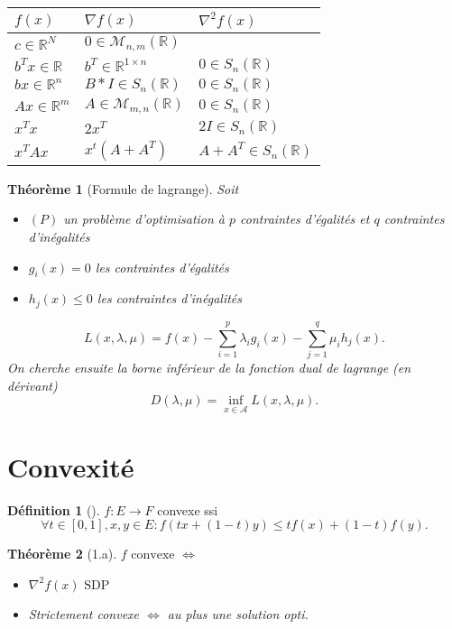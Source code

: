 \documentclass{article}
\theoremstyle{plain}%
\newtheorem{thm}{Théorème}[section]
\theoremstyle{definition}
\newtheorem{defn}{Définition}[section]
\begin{document}
\begin{table}[!h]
    \centering
    \begin{tabular}{|l|l|l|}
    \hline
        $ f(x) $                    & $ \nabla f(x) $                           & $ \nabla ^2 f(x) $            \\ \hline
        $ c \in \mathbb{R}^N $      & $ 0 \in \mathcal{M}_{n,m}(\mathbb{R}) $   & $ ~ $                         \\ \hline
        $ b^T x \in \mathbb{R} $    & $ b^T \in \mathbb{R}^{1 \times n} $       & $ 0 \in S_n(\mathbb{R}) $     \\ \hline
        $ bx \in \mathbb{R}^n $     & $ B*I \in S_n(\mathbb{R}) $               & $ 0 \in S_n(\mathbb{R}) $     \\ \hline
        $ Ax \in \mathbb{R}^m $     & $ A \in \mathcal{M}_{m,n}(\mathbb{R}) $   & $ 0 \in S_n(\mathbb{R}) $     \\ \hline
        $ x^Tx $                    & $ 2x^T $                                  & $ 2 I \in S_n(\mathbb{R}) $   \\ \hline
        $ x^T A x $                 & $ x^t (A + A^T) $                         & $ A+A^T \in S_n(\mathbb{R}) $ \\ \hline
    \end{tabular}
\end{table}

\begin{thm}[Formule de lagrange]
    Soit 
    \begin{itemize}
        \item $ (P) $ un problème d'optimisation à $ p $ contraintes d'égalités et $ q $ contraintes d'inégalités
        \item $ g_i (x) = 0 $ les contraintes d'égalités 
        \item $ h_j(x) \leq 0 $ les contraintes d'inégalités
    \end{itemize}
    \[
        L(x, \lambda , \mu ) = f(x) - \sum_{i=1}^{p}\lambda _i g_i(x) - \sum_{j=1}^{q}\mu _i h_j(x)
    .\]
    On cherche ensuite la borne inférieur de la fonction dual de lagrange (en dérivant)
    \[
        D(\lambda , \mu ) = \inf _{x \in \mathcal{A}} L(x, \lambda , \mu )
    .\]
\end{thm}


\section{Convexité}
\begin{defn}[]
    $ f : E \to F$ convexe ssi 
    \[
        \forall t \in [0,1], x,y \in E : f(tx + (1-t)y) \leq tf(x) + (1-t)f(y)
    .\]
\end{defn}
\begin{thm}[1.a]
    $ f \text{ convexe } \Leftrightarrow $ \begin{itemize}
        \item $\nabla ^2f(x) \text{ SDP }$ 
        \item Strictement convexe $ \Leftrightarrow $ au plus une solution opti.
    \end{itemize}
\end{thm}
\end{document}

